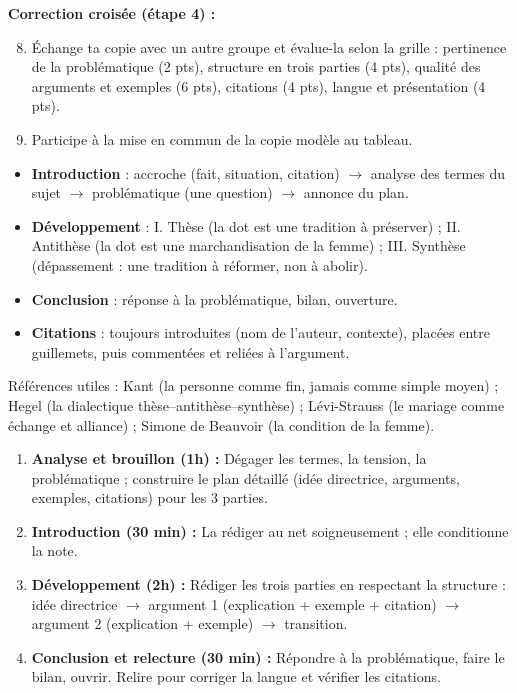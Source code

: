 \documentclass[11pt]{article}
\newcounter{popsec}
\newcounter{popsub}
\newcommand{\courssub}[1]{%
  \stepcounter{popsub}%
  \par\vspace{9pt}\noindent{\popxbold\fontsize{11.5}{13}\selectfont\color{popink}{\color{poporange}\thepopsec.\thepopsub}\hspace{6pt}#1}\par\nopagebreak\vspace{4pt}
}
\begin{document}
\textbf{Correction croisée (étape 4) :}
\begin{enumerate}
\setcounter{enumi}{7}
\item Échange ta copie avec un autre groupe et évalue-la selon la grille : pertinence de la problématique (2 pts), structure en trois parties (4 pts), qualité des arguments et exemples (6 pts), citations (4 pts), langue et présentation (4 pts).
\item Participe à la mise en commun de la copie modèle au tableau.
\end{enumerate}

\courssub{Ressources à mobiliser}

\begin{aretenir}
\begin{itemize}
\item \textbf{Introduction} : accroche (fait, situation, citation) $\rightarrow$ analyse des termes du sujet $\rightarrow$ problématique (une question) $\rightarrow$ annonce du plan.
\item \textbf{Développement} : I. Thèse (la dot est une tradition à préserver) ; II. Antithèse (la dot est une marchandisation de la femme) ; III. Synthèse (dépassement : une tradition à réformer, non à abolir).
\item \textbf{Conclusion} : réponse à la problématique, bilan, ouverture.
\item \textbf{Citations} : toujours introduites (nom de l'auteur, contexte), placées entre guillemets, puis commentées et reliées à l'argument.
\end{itemize}
Références utiles : Kant (la personne comme fin, jamais comme simple moyen) ; Hegel (la dialectique thèse--antithèse--synthèse) ; Lévi-Strauss (le mariage comme échange et alliance) ; Simone de Beauvoir (la condition de la femme).
\end{aretenir}

\begin{methode}
\begin{enumerate}
\item \textbf{Analyse et brouillon (1h) :} Dégager les termes, la tension, la problématique ; construire le plan détaillé (idée directrice, arguments, exemples, citations) pour les 3 parties.
\item \textbf{Introduction (30 min) :} La rédiger au net soigneusement ; elle conditionne la note.
\item \textbf{Développement (2h) :} Rédiger les trois parties en respectant la structure : idée directrice $\rightarrow$ argument 1 (explication + exemple + citation) $\rightarrow$ argument 2 (explication + exemple) $\rightarrow$ transition.
\item \textbf{Conclusion et relecture (30 min) :} Répondre à la problématique, faire le bilan, ouvrir. Relire pour corriger la langue et vérifier les citations.
\end{enumerate}
\end{methode}
\end{document}

